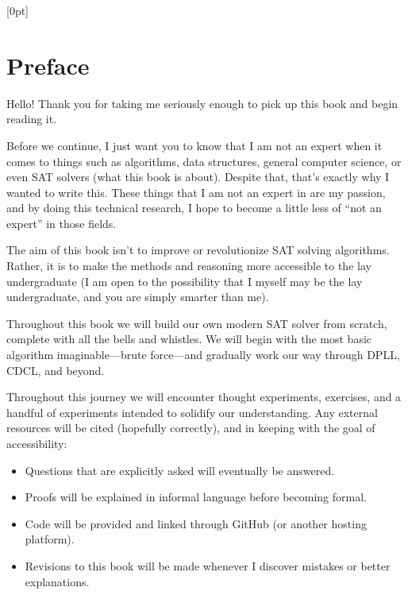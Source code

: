   [0pt]%
  {}%
  {\bfseries\chaptername\ \thecontentslabel\quad}%
  {}%
  {\bfseries\hfill\contentspage}%

\chapter*{Preface}

Hello! Thank you for taking me seriously enough to pick up this book and begin reading it.

Before we continue, I just want you to know that I am not an expert when it comes to things such as algorithms, data structures, general computer science, or even SAT solvers (what this book is about). Despite that, that's exactly why I wanted to write this. These things that I am not an expert in are my passion, and by doing this technical research, I hope to become a little less of ``not an expert'' in those fields.

The aim of this book isn't to improve or revolutionize SAT solving algorithms. Rather, it is to make the methods and reasoning more accessible to the lay undergraduate (I am open to the possibility that I myself may be the lay undergraduate, and you are simply smarter than me).

Throughout this book we will build our own modern SAT solver from scratch, complete with all the bells and whistles. We will begin with the most basic algorithm imaginable---brute force---and gradually work our way through DPLL, CDCL, and beyond.

Throughout this journey we will encounter thought experiments, exercises, and a handful of experiments intended to solidify our understanding. Any external resources will be cited (hopefully correctly), and in keeping with the goal of accessibility:

\begin{itemize}
    \item Questions that are explicitly asked will eventually be answered.
    \item Proofs will be explained in informal language before becoming formal.
    \item Code will be provided and linked through GitHub (or another hosting platform).
    \item Revisions to this book will be made whenever I discover mistakes or better explanations.
\end{itemize}


